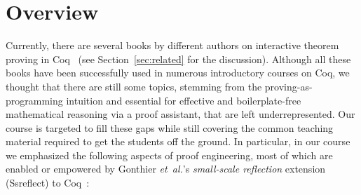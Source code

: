 \documentclass[blockstyle,preprint]{sigplanconf}
\newcommand{\etal}{\emph{et~al.}\xspace}
\begin{document}
\section{Overview}
\label{sec:overview}

Currently, there are several books by different authors on interactive
theorem proving in
Coq~\cite{Bertot-Casteran:BOOK,Pierce-al:SF,Chlipala:BOOK} (see
Section~\ref{sec:related} for the discussion).
%
Although all these books have been successfully used in numerous
introductory courses on Coq, we thought that there are still some
topics, stemming from the proving-as-programming intuition and
essential for effective and boilerplate-free mathematical reasoning
via a proof assistant, that are left underrepresented. Our course is
targeted to fill these gaps while still covering the common teaching
material required to get the students off the ground.
%
In particular, in our course we emphasized the following aspects of
proof engineering, most of which are enabled or empowered by Gonthier
\etal's \emph{small-scale reflection} extension (Ssreflect) to
Coq~\cite{Gonthier-al:TR}:

\vspace{5pt}
\end{document}
